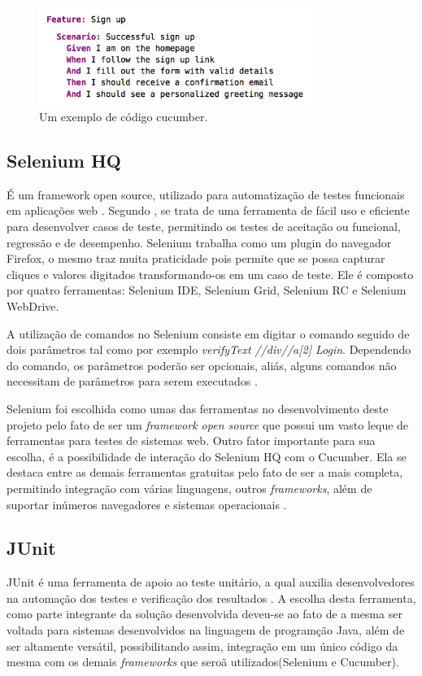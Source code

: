 \documentclass[tg]{mdtufsm}
\begin{document}
\begin{figure}[!htb]
    \centering
    \includegraphics[width=0.8\textwidth]{codigo_cucumber}
    \caption{Um exemplo de código cucumber.}
    \label{fig:codigo_cucumber}
\end{figure}

\subsection{Selenium HQ}
É um framework open source, utilizado para automatização de testes funcionais em aplicações web \cite{chiavegatto1desenvolvimento}. Segundo \citeauthor{pereiraestudoselenium} \cite{pereiraestudoselenium}, se trata
de uma ferramenta de fácil uso e eficiente para desenvolver casos de teste, permitindo os testes de aceitação ou funcional, regressão e de desempenho.
Selenium trabalha como um plugin do navegador Firefox, o mesmo traz muita praticidade pois permite que se possa capturar cliques e valores digitados transformando-os em um caso de teste. Ele é composto por
quatro ferramentas: Selenium IDE, Selenium Grid, Selenium RC e Selenium WebDrive.

A  utilização  de  comandos  no  Selenium  consiste  em  digitar  o  comando  seguido  de  dois parâmetros  tal  como  por  exemplo \emph{verifyText //div//a[2] Login}. Dependendo  do  comando,  os parâmetros
poderão ser opcionais, aliás, alguns comandos não necessitam de parâmetros para serem executados \cite{sixpenceautomatizaccao}.

Selenium foi escolhida como umas das ferramentas no desenvolvimento deste projeto pelo fato de ser um \emph{framework open source} que possui um vasto leque de ferramentas para testes de sistemas web. Outro fator
importante para sua escolha, é a possibilidade de interação do Selenium HQ com o Cucumber. Ela  se  destaca  entre  as demais ferramentas  gratuitas pelo fato de ser a mais completa, permitindo integração com
várias linguagens,  outros \emph{frameworks}, além de suportar inúmeros navegadores e sistemas operacionais \cite{pereiraestudoselenium}.

\subsection{JUnit}
JUnit é uma ferramenta de apoio ao teste unitário, a qual auxilia desenvolvedores na automação dos testes e verificação dos resultados \cite{biasi2006geraccao}. A escolha desta ferramenta, como parte integrante da solução desenvolvida deveu-se ao fato de a mesma ser voltada para sistemas desenvolvidos na linguagem de programção Java, além de ser altamente versátil, possibilitando assim, integração em um único código da mesma com os demais \emph{frameworks} que seroã utilizados(Selenium e Cucumber).
\end{document}
